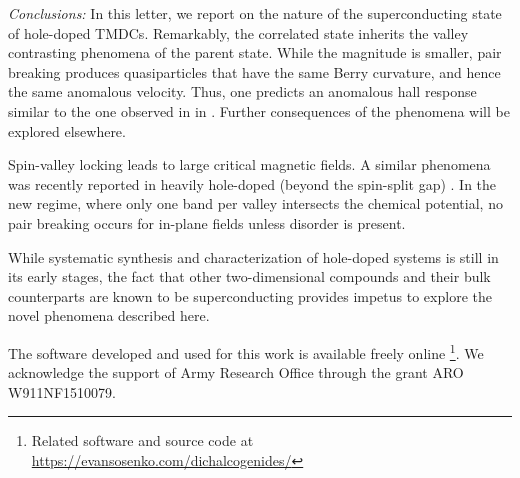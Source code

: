 
\textit{Conclusions:} In this letter, we report on the nature of the superconducting state
of hole-doped TMDCs.
Remarkably, the correlated state inherits
the valley contrasting phenomena of the parent state.
While the magnitude is smaller, pair breaking produces quasiparticles
that have the same Berry curvature, and hence the same anomalous velocity.
Thus, one predicts an anomalous hall response similar to
the one observed in in .
Further consequences of the phenomena will be explored elsewhere.

Spin-valley locking leads to large critical magnetic fields.
A similar phenomena was recently reported in heavily hole-doped
(beyond the spin-split gap) .
In the new regime, where only one band per valley intersects
the chemical potential, no pair breaking occurs
for in-plane fields unless disorder is present.

While systematic synthesis and characterization of hole-doped systems
is still in its early stages, the fact that other two-dimensional compounds
and their bulk counterparts are known to be superconducting
provides impetus to explore the novel phenomena described here.

The software developed and used for this work
is available freely online
\footnote{%
  Related software and source code at \\
  \url{https://evansosenko.com/dichalcogenides/}
}.
We acknowledge the support of Army Research Office through the grant
ARO W911NF1510079.
